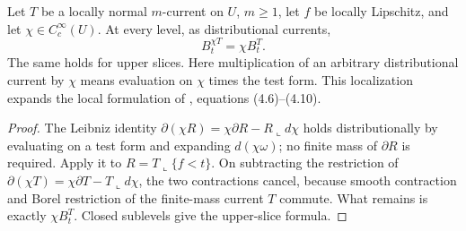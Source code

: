 \begin{proposition}\label{prop:slice-smooth-localization}
Let $T$ be a locally normal $m$-current on $U$, $m\geq1$, let $f$ be locally Lipschitz, and let $\chi\in C_c^\infty(U)$. At every level, as distributional currents,
\[
 B_t^{\chi T}=\chi B_t^T.
\]
The same holds for upper slices. Here multiplication of an arbitrary distributional current by $\chi$ means evaluation on $\chi$ times the test form. This localization expands the local formulation of \cite{Sim18}, equations (4.6)--(4.10).
\end{proposition}
\begin{proof}
The Leibniz identity $\partial(\chi R)=\chi\partial R-R\llcorner d\chi$ holds distributionally by evaluating on a test form and expanding $d(\chi\omega)$; no finite mass of $\partial R$ is required. Apply it to $R=T\llcorner\{f<t\}$. On subtracting the restriction of $\partial(\chi T)=\chi\partial T-T\llcorner d\chi$, the two contractions cancel, because smooth contraction and Borel restriction of the finite-mass current $T$ commute. What remains is exactly $\chi B_t^T$. Closed sublevels give the upper-slice formula.
\end{proof}

